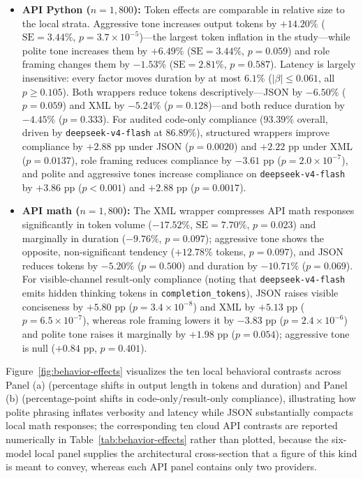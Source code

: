 \documentclass[a4paper,fleqn]{cas-sc}
\begin{document}
\begin{itemize}
\item \textbf{API Python ($n = 1,800$):} Token effects are comparable in relative size to the local strata. Aggressive tone increases output tokens by $+14.20\%$ ($\text{SE} = 3.44\%$, $p = 3.7 \times 10^{-5}$)—the largest token inflation in the study—while polite tone increases them by $+6.49\%$ ($\text{SE} = 3.44\%$, $p = 0.059$) and role framing changes them by $-1.53\%$ ($\text{SE} = 2.81\%$, $p = 0.587$). Latency is largely insensitive: every factor moves duration by at most $6.1\%$ ($|\beta| \le 0.061$, all $p \ge 0.105$). Both wrappers reduce tokens descriptively—JSON by $-6.50\%$ ($p = 0.059$) and XML by $-5.24\%$ ($p = 0.128$)—and both reduce duration by $-4.45\%$ ($p = 0.333$). For audited code-only compliance ($93.39\%$ overall, driven by \texttt{deepseek-v4-flash} at $86.89\%$), structured wrappers improve compliance by $+2.88$ pp under JSON ($p = 0.0020$) and $+2.22$ pp under XML ($p = 0.0137$), role framing reduces compliance by $-3.61$ pp ($p = 2.0 \times 10^{-7}$), and polite and aggressive tones increase compliance on \texttt{deepseek-v4-flash} by $+3.86$ pp ($p < 0.001$) and $+2.88$ pp ($p = 0.0017$).
\item \textbf{API math ($n = 1,800$):} The XML wrapper compresses API math responses significantly in token volume ($-17.52\%$, $\text{SE} = 7.70\%$, $p = 0.023$) and marginally in duration ($-9.76\%$, $p = 0.097$); aggressive tone shows the opposite, non-significant tendency ($+12.78\%$ tokens, $p = 0.097$), and JSON reduces tokens by $-5.20\%$ ($p = 0.500$) and duration by $-10.71\%$ ($p = 0.069$). For visible-channel result-only compliance (noting that \texttt{deepseek-v4-flash} emits hidden thinking tokens in \texttt{completion\_tokens}), JSON raises visible conciseness by $+5.80$ pp ($p = 3.4 \times 10^{-8}$) and XML by $+5.13$ pp ($p = 6.5 \times 10^{-7}$), whereas role framing lowers it by $-3.83$ pp ($p = 2.4 \times 10^{-6}$) and polite tone raises it marginally by $+1.98$ pp ($p = 0.054$); aggressive tone is null ($+0.84$ pp, $p = 0.401$).
\end{itemize}

Figure~\ref{fig:behavior-effects} visualizes the ten local behavioral contrasts across Panel (a) (percentage shifts in output length in tokens and duration) and Panel (b) (percentage-point shifts in code-only/result-only compliance), illustrating how polite phrasing inflates verbosity and latency while JSON substantially compacts local math responses; the corresponding ten cloud API contrasts are reported numerically in Table~\ref{tab:behavior-effects} rather than plotted, because the six-model local panel supplies the architectural cross-section that a figure of this kind is meant to convey, whereas each API panel contains only two providers.
\end{document}
